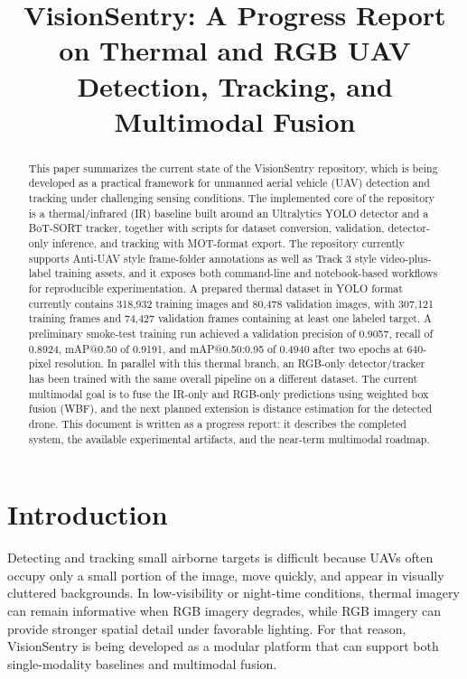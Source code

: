 \documentclass[10pt,conference]{IEEEtran}
\title{VisionSentry: A Progress Report on Thermal and RGB UAV Detection, Tracking, and Multimodal Fusion}
\author{
\IEEEauthorblockN{Author Name(s)}
\IEEEauthorblockA{VisionSentry Project}
}
\begin{document}
\maketitle

\begin{abstract}
This paper summarizes the current state of the VisionSentry repository, which is being developed as a practical framework for unmanned aerial vehicle (UAV) detection and tracking under challenging sensing conditions. The implemented core of the repository is a thermal/infrared (IR) baseline built around an Ultralytics YOLO detector and a BoT-SORT tracker, together with scripts for dataset conversion, validation, detector-only inference, and tracking with MOT-format export. The repository currently supports Anti-UAV style frame-folder annotations as well as Track 3 style video-plus-label training assets, and it exposes both command-line and notebook-based workflows for reproducible experimentation. A prepared thermal dataset in YOLO format currently contains 318,932 training images and 80,478 validation images, with 307,121 training frames and 74,427 validation frames containing at least one labeled target. A preliminary smoke-test training run achieved a validation precision of 0.9057, recall of 0.8924, mAP@0.50 of 0.9191, and mAP@0.50:0.95 of 0.4940 after two epochs at 640-pixel resolution. In parallel with this thermal branch, an RGB-only detector/tracker has been trained with the same overall pipeline on a different dataset. The current multimodal goal is to fuse the IR-only and RGB-only predictions using weighted box fusion (WBF), and the next planned extension is distance estimation for the detected drone. This document is written as a progress report: it describes the completed system, the available experimental artifacts, and the near-term multimodal roadmap.
\end{abstract}

\section{Introduction}
Detecting and tracking small airborne targets is difficult because UAVs often occupy only a small portion of the image, move quickly, and appear in visually cluttered backgrounds. In low-visibility or night-time conditions, thermal imagery can remain informative when RGB imagery degrades, while RGB imagery can provide stronger spatial detail under favorable lighting. For that reason, VisionSentry is being developed as a modular platform that can support both single-modality baselines and multimodal fusion.
\end{document}
